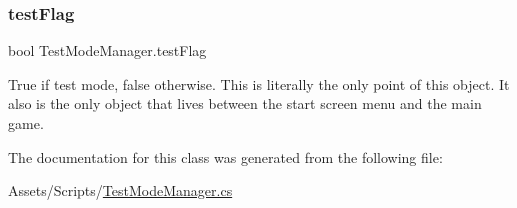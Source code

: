 \subsubsection{\texorpdfstring{testFlag}{testFlag}}
{\footnotesize\ttfamily bool Test\+Mode\+Manager.\+test\+Flag}



True if test mode, false otherwise. This is literally the only point of this object. It also is the only object that lives between the start screen menu and the main game. 



The documentation for this class was generated from the following file\+:\begin{DoxyCompactItemize}
\item 
Assets/\+Scripts/\mbox{\hyperlink{_test_mode_manager_8cs}{Test\+Mode\+Manager.\+cs}}\end{DoxyCompactItemize}
